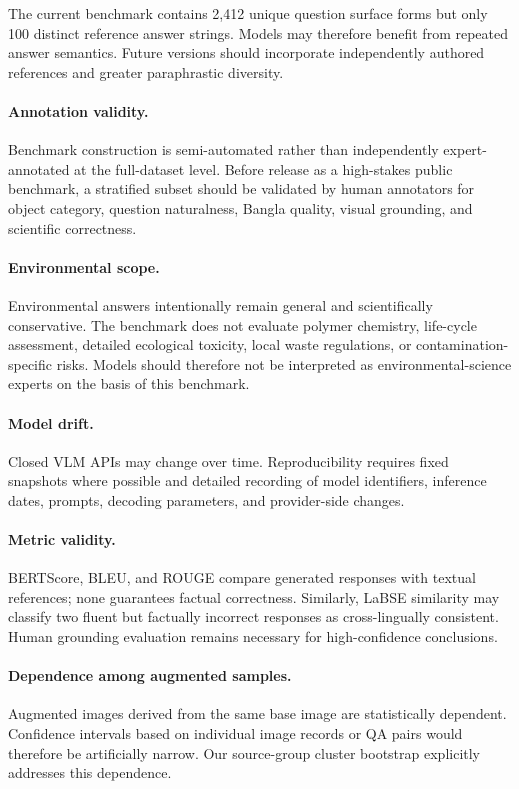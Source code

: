 \documentclass{article}
\begin{document}
The current benchmark contains 2,412 unique question surface forms but only 100 distinct reference answer strings. Models may therefore benefit from repeated answer semantics. Future versions should incorporate independently authored references and greater paraphrastic diversity.

\paragraph{Annotation validity.}
Benchmark construction is semi-automated rather than independently expert-annotated at the full-dataset level. Before release as a high-stakes public benchmark, a stratified subset should be validated by human annotators for object category, question naturalness, Bangla quality, visual grounding, and scientific correctness.

\paragraph{Environmental scope.}
Environmental answers intentionally remain general and scientifically conservative. The benchmark does not evaluate polymer chemistry, life-cycle assessment, detailed ecological toxicity, local waste regulations, or contamination-specific risks. Models should therefore not be interpreted as environmental-science experts on the basis of this benchmark.

\paragraph{Model drift.}
Closed VLM APIs may change over time. Reproducibility requires fixed snapshots where possible and detailed recording of model identifiers, inference dates, prompts, decoding parameters, and provider-side changes.

\paragraph{Metric validity.}
BERTScore, BLEU, and ROUGE compare generated responses with textual references; none guarantees factual correctness. Similarly, LaBSE similarity may classify two fluent but factually incorrect responses as cross-lingually consistent. Human grounding evaluation remains necessary for high-confidence conclusions.

\paragraph{Dependence among augmented samples.}
Augmented images derived from the same base image are statistically dependent. Confidence intervals based on individual image records or QA pairs would therefore be artificially narrow. Our source-group cluster bootstrap explicitly addresses this dependence.
\end{document}

